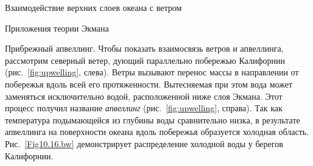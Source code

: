 \begin{chapter}{Взаимодействие верхних слоев океана с ветром}
\begin{section}{Приложения теории Экмана}
\begin{paragraph}{Прибрежный апвеллинг.}
Чтобы показать взаимосвязь ветров
и апвеллинга, рассмотрим северный ветер,
дующий параллельно побережью Калифорнии (рис.~\ref{fig:upwelling}, слева). 
Ветры вызывают перенос массы в направлении
от побережья вдоль всей его протяженности. Вытесняемая при этом вода может
заменяться исключительно водой, расположенной ниже слоя Экмана. Этот процесс
получил название \textit{апвеллинг} 
(рис.~\ref{fig:upwelling}, справа). Так как температура подымающейся из 
глубины воды сравнительно низка, в результате апвеллинга на поверхности океана
вдоль побережья образуется холодная область. Рис.~\ref{Fig10.16.bw}
демонстрирует распределение холодной воды у берегов Калифорнии.
%


\end{paragraph}
\end{section}
\end{chapter}
